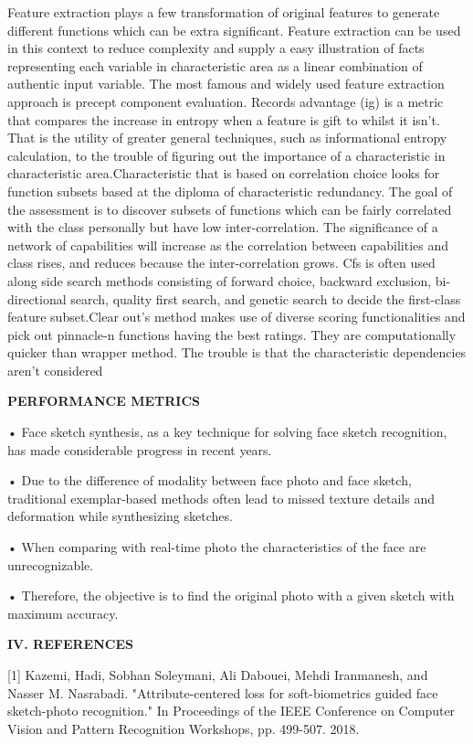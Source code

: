 \documentclass[journal]{IEEEtran} %
\begin{document}
Feature extraction plays a few transformation of original features to generate different functions which can be extra significant. 
Feature extraction can be used in this context to reduce complexity and supply a easy illustration of facts representing each variable in characteristic area as a linear combination of authentic input variable. The most famous and widely used feature extraction approach is precept component evaluation.
Records advantage (ig) is a metric that compares the increase in entropy when a feature is gift to whilst it isn't. That is the utility of greater general techniques, such as informational entropy calculation, to the trouble of figuring out the importance of a characteristic in characteristic area.Characteristic that is based on correlation choice looks for function subsets based at the diploma of characteristic redundancy. The goal of the assessment is to discover subsets of functions which can be fairly correlated with the class personally but have low inter-correlation. The significance of a network of capabilities will increase as the correlation between capabilities and class rises, and reduces because the inter-correlation grows. Cfs is often used along side search methods consisting of forward choice, backward exclusion, bi-directional search, quality first search, and genetic search to decide the first-class feature subset.Clear out’s method makes use of diverse scoring functionalities and pick out pinnacle-n functions having the best ratings. They are computationally quicker than wrapper method. The trouble is that the characteristic dependencies aren't considered

\textbf{PERFORMANCE METRICS}

•	Face sketch synthesis, as a key technique for solving face sketch recognition, has made considerable progress in recent years. 

•	Due to the difference of modality between face photo and face sketch, traditional exemplar-based methods often lead to missed texture details and deformation while synthesizing sketches. 

•	When comparing with real-time photo the characteristics of the face are unrecognizable.

•	Therefore, the objective is to find the original photo with a given sketch with maximum accuracy.

\vspace
\textbf{\textbf{IV. REFERENCES}}

[1] Kazemi, Hadi, Sobhan Soleymani, Ali Dabouei, Mehdi Iranmanesh, and Nasser M. Nasrabadi. "Attribute-centered loss for soft-biometrics guided face sketch-photo recognition." In Proceedings of the IEEE Conference on Computer Vision and Pattern Recognition Workshops, pp. 499-507. 2018. 
\end{document}
